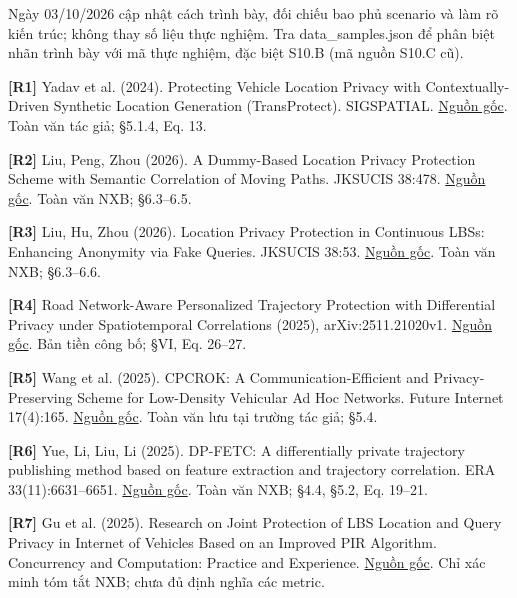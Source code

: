 \documentclass[10pt,a4paper]{article}
\begin{document}
Ngày 03/10/2026 cập nhật cách trình bày, đối chiếu bao phủ scenario và làm rõ kiến trúc; không thay số liệu thực nghiệm. Tra data\_\allowbreak{}samples.json để phân biệt nhãn trình bày với mã thực nghiệm, đặc biệt S10.B (mã nguồn S10.C cũ).

\par\hypertarget{ref-R1}{}\textbf{[R1]} Yadav et al. (2024). Protecting Vehicle Location Privacy with Contextually-Driven Synthetic Location Generation (TransProtect). SIGSPATIAL. \href{https://arxiv.org/html/2409.09495v1}{Nguồn gốc}. Toàn văn tác giả; §5.1.4, Eq. 13.
\par\hypertarget{ref-R2}{}\textbf{[R2]} Liu, Peng, Zhou (2026). A Dummy-Based Location Privacy Protection Scheme with Semantic Correlation of Moving Paths. JKSUCIS 38:478. \href{https://link.springer.com/article/10.1007/s44443-026-00899-w}{Nguồn gốc}. Toàn văn NXB; §6.3–6.5.
\par\hypertarget{ref-R3}{}\textbf{[R3]} Liu, Hu, Zhou (2026). Location Privacy Protection in Continuous LBSs: Enhancing Anonymity via Fake Queries. JKSUCIS 38:53. \href{https://link.springer.com/article/10.1007/s44443-025-00438-z}{Nguồn gốc}. Toàn văn NXB; §6.3–6.6.
\par\hypertarget{ref-R4}{}\textbf{[R4]} Road Network-Aware Personalized Trajectory Protection with Differential Privacy under Spatiotemporal Correlations (2025), arXiv:2511.21020v1. \href{https://arxiv.org/html/2511.21020v1}{Nguồn gốc}. Bản tiền công bố; §VI, Eq. 26–27.
\par\hypertarget{ref-R5}{}\textbf{[R5]} Wang et al. (2025). CPCROK: A Communication-Efficient and Privacy-Preserving Scheme for Low-Density Vehicular Ad Hoc Networks. Future Internet 17(4):165. \href{https://uhra.herts.ac.uk/id/eprint/25705/1/futureinternet-17-00165.pdf}{Nguồn gốc}. Toàn văn lưu tại trường tác giả; §5.4.
\par\hypertarget{ref-R6}{}\textbf{[R6]} Yue, Li, Liu, Li (2025). DP-FETC: A differentially private trajectory publishing method based on feature extraction and trajectory correlation. ERA 33(11):6631–6651. \href{https://www.aimspress.com/aimspress-data/era/2025/11/PDF/era-33-11-293.pdf}{Nguồn gốc}. Toàn văn NXB; §4.4, §5.2, Eq. 19–21.
\par\hypertarget{ref-R7}{}\textbf{[R7]} Gu et al. (2025). Research on Joint Protection of LBS Location and Query Privacy in Internet of Vehicles Based on an Improved PIR Algorithm. Concurrency and Computation: Practice and Experience. \href{https://onlinelibrary.wiley.com/doi/abs/10.1002/cpe.70447}{Nguồn gốc}. Chỉ xác minh tóm tắt NXB; chưa đủ định nghĩa các metric.
\end{document}
